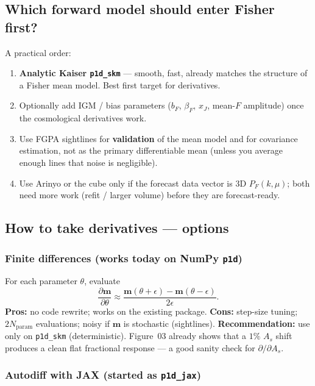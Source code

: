 \documentclass[11pt]{article}
\begin{document}
\subsection{Which forward model should enter Fisher first?}

A practical order:
\begin{enumerate}
\item \textbf{Analytic Kaiser \texttt{p1d\_skm}} --- smooth, fast, already matches the structure of a Fisher mean model. Best first target for derivatives.
\item Optionally add IGM / bias parameters ($b_F$, $\beta_F$, $x_J$, mean-$F$ amplitude) once the cosmological derivatives work.
\item Use FGPA sightlines for \textbf{validation} of the mean model and for covariance estimation, not as the primary differentiable mean (unless you average enough lines that noise is negligible).
\item Use Arinyo or the cube only if the forecast data vector is 3D $P_F(k,\mu)$; both need more work (refit / larger volume) before they are forecast-ready.
\end{enumerate}

\subsection{How to take derivatives --- options}

\subsubsection{Finite differences (works today on NumPy \texttt{p1d})}

For each parameter $\theta$, evaluate
\begin{equation}
\frac{\partial\mathbf{m}}{\partial\theta}
\approx
\frac{\mathbf{m}(\theta+\epsilon)-\mathbf{m}(\theta-\epsilon)}{2\epsilon}.
\end{equation}
\textbf{Pros:} no code rewrite; works on the existing package.
\textbf{Cons:} step-size tuning; $2N_{\mathrm{param}}$ evaluations; noisy if $\mathbf{m}$ is stochastic (sightlines).
\textbf{Recommendation:} use only on \texttt{p1d\_skm} (deterministic). Figure~03 already shows that a $1\%$ $A_s$ shift produces a clean flat fractional response --- a good sanity check for $\partial/\partial A_s$.

\subsubsection{Autodiff with JAX (started as \texttt{p1d\_jax})}
\end{document}
